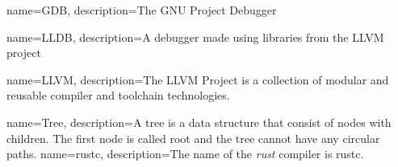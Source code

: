 {
    name=GDB,
    description={The GNU Project Debugger}
}

{
    name=LLDB,
    description={A debugger made using libraries from the LLVM project}
}

{
    name=LLVM,
    description={The LLVM Project is a collection of modular and reusable compiler and toolchain technologies.}
}

{
    name=Tree,
    description={A tree is a data structure that consist of nodes with children. The first node is called root and the tree cannot have any circular paths.}
}
{
    name=rustc,
    description={The name of the \emph{rust} compiler is rustc.}
}








